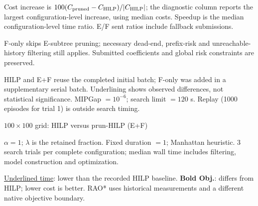 \documentclass[10pt]{article}
\begin{document}
\noindent\small Cost increase is $100(C_{\rm pruned}-C_{\rm HILP})/|C_{\rm HILP}|$; the diagnostic column reports the largest configuration-level increase, using median costs. Speedup is the median configuration-level time ratio. E/F sent ratios include fallback submissions.\par
\noindent\small F-only skips E-subtree pruning; necessary dead-end, prefix-risk and unreachable-history filtering still applies. Submitted coefficients and global risk constraints are preserved.\par
\noindent\small HILP and E+F reuse the completed initial batch; F-only was added in a supplementary serial batch. Underlining shows observed differences, not statistical significance. MIPGap $=10^{-6}$; search limit $=120$ s. Replay (1000 episodes for trial 1) is outside search timing.\par
\clearpage
\begin{center}\Large $ 100\times100$ grid: HILP versus prun-HILP (E+F)\end{center}
\noindent $\alpha=1$; $\lambda$ is the retained fraction. Fixed duration $=1$; Manhattan heuristic. 3 search trials per complete configuration; median wall time includes filtering, model construction and optimization.\par
\noindent \underline{Underlined time}: lower than the recorded HILP baseline. \textbf{Bold Obj.}: differs from HILP; lower cost is better. RAO* uses historical measurements and a different native objective boundary.\par
\end{document}
